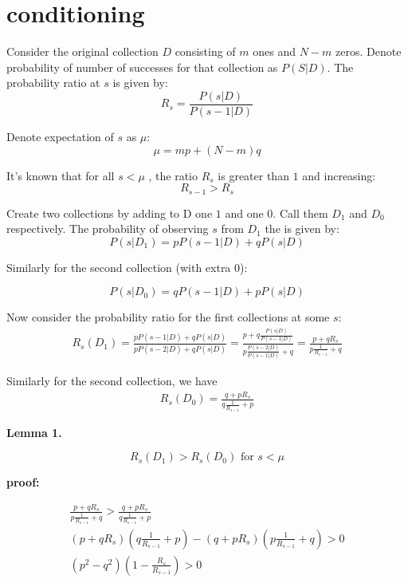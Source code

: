 \documentclass[11pt,draft]{article}
\title{}
\begin{document}
\maketitle

\section{conditioning}

Consider the original collection $D$ consisting of $m$ ones and $N-m$ zeros.  Denote probability of number of successes for that collection as $P(S|D)$.
The probability ratio at $s$  is given by:
\[ R_s = \frac{P(s|D)}{P(s-1|D)} \] 

Denote expectation of $s$ as $\mu$:
\[ \mu = mp + (N-m)q \]

It's known that for all $s < \mu$ , the ratio $R_s$ is greater than $1$ and increasing:
\[R_{s-1} > R_s \]

Create two collections by adding to D one $1$ and one $0$.  Call them $D_1$ and $D_0$ respectively. The probability of observing $s$ from $D_1$ the is given by:
\[ P(s | D_1) = pP(s-1|D) + qP(s|D) \]

Similarly for the second collection (with extra 0):

\[ P(s | D_0) = qP(s-1|D) + pP(s|D) \]

Now consider the probability ratio for the first collections at some $s$:
\begin{align}
R_s(D_1) = \frac{ pP(s-1|D) + qP(s|D) }{pP(s-2|D) + qP(s|D)} = \frac{p + q\frac{P(s|D)}{P(s-1|D)}}{p\frac{P(s-2|D)}{P(s-1|D)} + q} = \frac{p + qR_s}{p\frac{1}{R_{s-1}} + q}
\end{align}

Similarly for the second collection, we have
\begin{align}
R_s(D_0) = \frac{q + pR_s}{q\frac{1}{R_{s-1}} + p}
\end{align}


\textbf{Lemma 1.}

\[ R_s(D_1) > R_s(D_0)  \text{ for } s< \mu \]

\textbf{proof:}
 
 \begin{align}
\frac{p+ qR_s}{p\frac{1}{R_{s-1}} + q} > \frac{q + pR_s}{q\frac{1}{R_{s-1}} + p} \\
(p + qR_s)(q\frac{1}{R_{s-1}} + p)  - (q + pR_s)(p\frac{1}{R_{s-1}} + q) > 0 \\
(p^2 - q^2 )(1 - \frac{R_s}{R_{s-1}}) > 0
\end{align}
\end{document}
